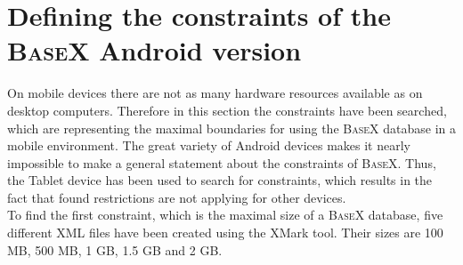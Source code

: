%

\section{Defining the constraints of the \textsc{BaseX} Android version}
\label{sec:defining-the-constraints}
On mobile devices there are not as many hardware resources available as on desktop computers.
Therefore in this section the constraints have been searched, which are representing the maximal boundaries for using the \textsc{BaseX} database in a mobile environment.
The great variety of Android devices makes it nearly impossible to make a general statement about the constraints of \textsc{BaseX}.
Thus, the Tablet device has been used to search for constraints, which results in the fact that found restrictions are not applying for other devices.\\
To find the first constraint, which is the maximal size of a \textsc{BaseX} database, five different XML files have been created using the XMark tool.
Their sizes are 100 MB, 500 MB, 1 GB, 1.5 GB and 2 GB.




